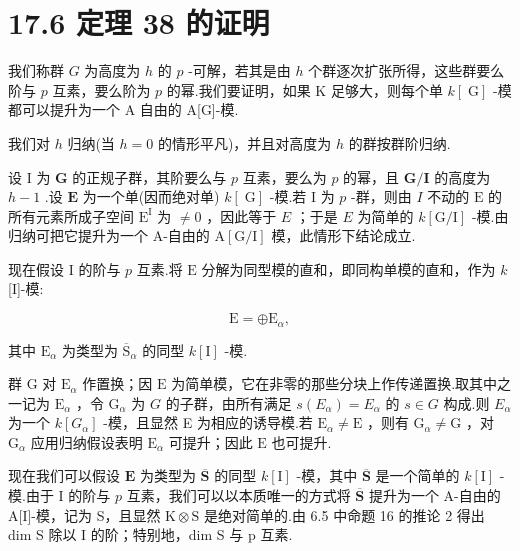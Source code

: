 \documentclass[10pt]{article}
\begin{document}
\section*{17.6 定理 38 的证明}

我们称群 \(G\) 为高度为 \(h\) 的 \(p\) -可解，若其是由 \(h\) 个群逐次扩张所得，这些群要么阶与 \(p\) 互素，要么阶为 \(p\) 的幂.我们要证明，如果 \(\mathrm{K}\) 足够大，则每个单 \(k\left\lbrack  \mathrm{\;G}\right\rbrack\) -模都可以提升为一个 A 自由的 A[G]-模.

我们对 \(h\) 归纳(当 \(h = 0\) 的情形平凡)，并且对高度为 \(h\) 的群按群阶归纳.

设 I 为 \(\mathbf{G}\) 的正规子群，其阶要么与 \(p\) 互素，要么为 \(p\) 的幂，且 \(\mathbf{G}/\mathbf{I}\) 的高度为 \(h - 1\) .设 \(\mathbf{E}\) 为一个单(因而绝对单) \(k\left\lbrack  \mathrm{\;G}\right\rbrack\) -模.若 I 为 \(p\) -群，则由 \(I\) 不动的 \(\mathrm{E}\) 的所有元素所成子空间 \({\mathrm{E}}^{\mathrm{I}}\) 为 \(\neq  0\) ，因此等于 \(E\) ；于是 \(E\) 为简单的 \(k\left\lbrack  {\mathrm{G}/\mathrm{I}}\right\rbrack\) -模.由归纳可把它提升为一个 A-自由的 \(\mathrm{A}\left\lbrack  {\mathrm{G}/\mathrm{I}}\right\rbrack\) 模，此情形下结论成立.

现在假设 I 的阶与 \(p\) 互素.将 \(\mathrm{E}\) 分解为同型模的直和，即同构单模的直和，作为 \(k\) [I]-模:

\[
\mathrm{E} =  \oplus  {\mathrm{E}}_{\alpha },
\]

其中 \({\mathrm{E}}_{\alpha }\) 为类型为 \({\overline{\mathrm{S}}}_{\alpha }\) 的同型 \(k\left\lbrack  \mathrm{I}\right\rbrack\) -模.

群 \(\mathrm{G}\) 对 \({\mathrm{E}}_{\alpha }\) 作置换；因 \(\mathrm{E}\) 为简单模，它在非零的那些分块上作传递置换.取其中之一记为 \({\mathrm{E}}_{\alpha }\) ，令 \({\mathrm{G}}_{\alpha }\) 为 \(G\) 的子群，由所有满足 \(s\left( {E}_{\alpha }\right)  = {E}_{\alpha }\) 的 \(s \in  G\) 构成.则 \({E}_{\alpha }\) 为一个 \(k\left\lbrack  {G}_{\alpha }\right\rbrack\) -模，且显然 E 为相应的诱导模.若 \({\mathrm{E}}_{\alpha } \neq  \mathrm{E}\) ，则有 \({\mathrm{G}}_{\alpha } \neq  \mathrm{G}\) ，对 \({\mathrm{G}}_{\alpha }\) 应用归纳假设表明 \({\mathrm{E}}_{\alpha }\) 可提升；因此 \(\mathrm{E}\) 也可提升.

现在我们可以假设 \(\mathbf{E}\) 为类型为 \(\overline{\mathbf{S}}\) 的同型 \(k\left\lbrack  \mathrm{I}\right\rbrack\) -模，其中 \(\overline{\mathbf{S}}\) 是一个简单的 \(k\left\lbrack  \mathrm{I}\right\rbrack\) -模.由于 \(\mathrm{I}\) 的阶与 \(p\) 互素，我们可以以本质唯一的方式将 \(\overline{\mathbf{S}}\) 提升为一个 A-自由的 A[I]-模，记为 S，且显然 \(\mathrm{K} \otimes  \mathrm{S}\) 是绝对简单的.由 6.5 中命题 16 的推论 2 得出 dim S 除以 I 的阶；特别地，dim S 与 p 互素.
\end{document}
